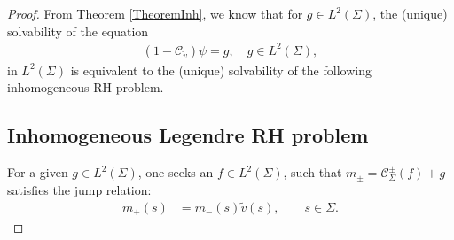 \documentclass[11pt]{article}
\numberwithin{equation}{section}
\newcommand{\tv}{{\widetilde v}}
\newcommand{\Cau}{\mathcal C_{\Sigma}}
\newcommand{\Cautv}{\mathcal C_{\tv}}
\newcommand{\Ltwo}{L^2(\Sigma)}
\numberwithin{equation}{section}
\begin{document}
\begin{proof}
From Theorem \ref{TheoremInh}, we know that for $g \in \Ltwo$, the (unique) solvability of the equation
\begin{align}\label{SingIE}
(1-\Cautv)\psi = g, \quad g\in \Ltwo,
\end{align}
in $\Ltwo$ is equivalent to the (unique) solvability of the following inhomogeneous RH problem.

\subsection*{Inhomogeneous Legendre RH problem}
For a given $g \in \Ltwo$, one seeks an $f \in \Ltwo$, such that $m_\pm = \Cau^\pm(f)+g$ satisfies the jump relation:
\begin{align*}
 m_+(s) &= m_-(s) \tv(s), \qquad s \in \Sigma.
\end{align*}


\end{proof}
\end{document}
